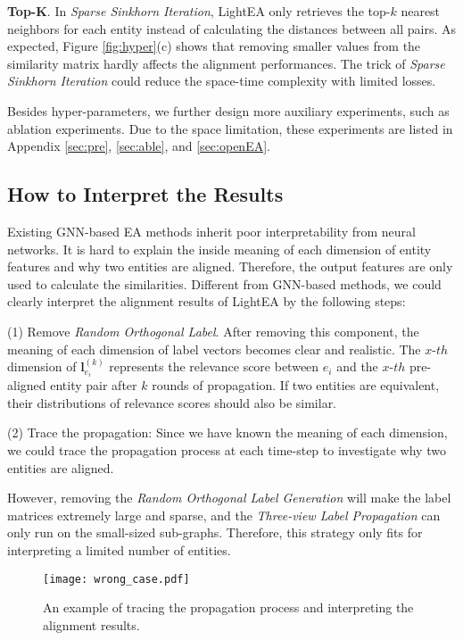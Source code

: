 \documentclass[11pt]{article}
\begin{document}
\noindent
\textbf{Top-K}.
In \emph{Sparse Sinkhorn Iteration}, LightEA only retrieves the top-$k$ nearest neighbors for each entity instead of calculating the distances between all pairs.
As expected, Figure \ref{fig:hyper}(c) shows that removing smaller values from the similarity matrix hardly affects the alignment performances.
The trick of \emph{Sparse Sinkhorn Iteration} could reduce the space-time complexity with limited losses.

Besides hyper-parameters, we further design more auxiliary experiments, such as ablation experiments.
Due to the space limitation, these experiments are listed in Appendix \ref{sec:pre}, \ref{sec:able}, and \ref{sec:openEA}.

\subsection{How to Interpret the Results}
\label{sec:interpret}
Existing GNN-based EA methods inherit poor interpretability from neural networks.
It is hard to explain the inside meaning of each dimension of entity features and why two entities are aligned.
Therefore, the output features are only used to calculate the similarities.
Different from GNN-based methods, we could clearly interpret the alignment results of LightEA by the following steps:

(1) Remove \emph{Random Orthogonal Label}.
After removing this component, the meaning of each dimension of label vectors becomes clear and realistic.
The $x$-$th$ dimension of $\bm l_{e_i}^{(k)}$ represents the relevance score between $e_i$ and the $x$-$th$ pre-aligned entity pair after $k$ rounds of propagation.
If two entities are equivalent, their distributions of relevance scores should also be similar.

(2) Trace the propagation:
Since we have known the meaning of each dimension, we could trace the propagation process at each time-step to investigate why two entities are aligned.

However, removing the \emph{Random Orthogonal Label Generation} will make the label matrices extremely large and sparse, and the \emph{Three-view Label Propagation} can only run on the small-sized sub-graphs.
Therefore, this strategy only fits for interpreting a limited number of entities.

\begin{figure*}[t]
    \centering
    \texttt{[image: wrong\_case.pdf]}
    \caption{An example of tracing the propagation process and interpreting the alignment results.}
    \label{fig:wrong}
\end{figure*}
\end{document}
